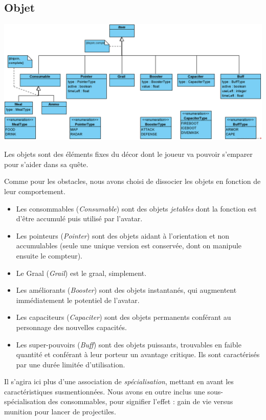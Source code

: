 \documentclass[oneside,a4paper]{book}
\begin{document}
\subsection{Objet}
\includegraphics[width=\textwidth,height=\textheight,keepaspectratio]{Diagrams/DJ-Item.png}\newline

Les objets sont des éléments fixes du décor dont le joueur va pouvoir s'emparer pour s'aider dans sa quête.\newline

Comme pour les obstacles, nous avons choisi de dissocier les objets en fonction de leur comportement.
\begin{itemize}
    \item Les consommables (\textit{Consumable}) sont des objets \textit{jetables} dont la fonction est d'être accumulé puis utilisé par l'avatar. 
    \item Les pointeurs (\textit{Pointer}) sont des objets aidant à l'orientation et non accumulables (seule une unique version est conservée, dont on manipule ensuite le compteur).
    \item Le Graal (\textit{Grail}) est le graal, simplement.
    \item Les améliorants (\textit{Booster}) sont des objets instantanés, qui augmentent immédiatement le potentiel de l'avatar.
    \item Les capaciteurs (\textit{Capaciter}) sont des objets permanents conférant au personnage des nouvelles capacités.
    \item Les super-pouvoirs (\textit{Buff}) sont des objets puissants, trouvables en faible quantité et conférant à leur porteur un avantage critique. Ils sont caractérisés par une durée limitée d'utilisation.
\end{itemize}

Il s'agira ici plus d'une association de \textit{spécialisation}, mettant en avant les caractéristiques susmentionnées. Nous avons en outre inclus une sous-spécialisation des consommables, pour signifier l'effet : gain de vie versus munition pour lancer de projectiles.\newline
\end{document}
